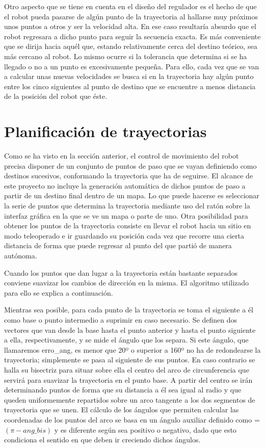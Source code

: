 \clearpage
Otro aspecto que se tiene en cuenta en el diseño del regulador es el hecho de que el robot pueda pasarse de algún punto de la trayectoria al hallarse muy próximos unos puntos a otros y ser la velocidad alta. En ese caso resultaría absurdo que el robot regresara a dicho punto para seguir la secuencia exacta. Es más conveniente que se dirija hacia aquél que, estando relativamente cerca del destino teórico, sea más cercano al robot. Lo mismo ocurre si la tolerancia que determina si se ha llegado o no a un punto es excesivamente pequeña. Para ello, cada vez que se van a calcular unas nuevas velocidades se busca si en la trayectoria hay algún punto entre los cinco siguientes al punto de destino que se encuentre a menos distancia de la posición del robot que éste.

\section{Planificación de trayectorias}\label{tray}

Como se ha visto en la sección anterior, el control de movimiento del robot precisa disponer de un conjunto de puntos de paso que se vayan definiendo como destinos sucesivos, conformando la trayectoria que ha de seguirse. El alcance de este proyecto no incluye la generación automática de dichos puntos de paso a partir de un destino final dentro de un mapa. Lo que puede hacerse es seleccionar la serie de puntos que determina la trayectoria mediante uso del ratón sobre la interfaz gráfica en la que se ve un mapa o parte de uno. Otra posibilidad para obtener los puntos de la trayectoria consiste en llevar el robot hacia un sitio en modo teleoperado e ir guardando su posición cada vez que recorre una cierta distancia de forma que puede regresar al punto del que partió de manera autónoma.

Cuando los puntos que dan lugar a la trayectoria están bastante separados conviene suavizar los cambios de dirección en la misma. El algoritmo utilizado para ello se explica a continuación.

Mientras sea posible, para cada punto de la trayectoria se toma el siguiente a él como base o punto intermedio a suprimir en caso necesario. Se definen dos vectores que van desde la base hasta el punto anterior y hasta el punto siguiente a ella, respectivamente, y se mide el ángulo que los separa. Si este ángulo, que llamaremos erro\_ang, es menor que 20º o superior a 160º no ha de redondearse la trayectoria; simplemente se pasa al siguiente de sus puntos. En caso contrario se halla su bisectriz para situar sobre ella el centro del arco de circunferencia que servirá para suavizar la trayectoria en el punto base. A partir del centro se irán determinando puntos de forma que su distancia a él sea igual al radio y que queden uniformemente repartidos sobre un arco tangente a los dos segmentos de trayectoria que se unen. El cálculo de los ángulos que permiten calcular las coordenadas de los puntos del arco se basa en un ángulo auxiliar definido como  = $(\pi - ang\_bis)$ y es diferente según  sea positivo o negativo, dado que esto condiciona el sentido en que deben ir creciendo dichos ángulos.

